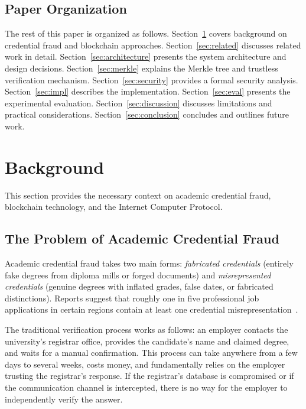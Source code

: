 \documentclass[conference]{IEEEtran}
\begin{document}
\subsection{Paper Organization}

The rest of this paper is organized as follows. Section~\ref{sec:background} covers background on credential fraud and blockchain approaches. Section~\ref{sec:related} discusses related work in detail. Section~\ref{sec:architecture} presents the system architecture and design decisions. Section~\ref{sec:merkle} explains the Merkle tree and trustless verification mechanism. Section~\ref{sec:security} provides a formal security analysis. Section~\ref{sec:impl} describes the implementation. Section~\ref{sec:eval} presents the experimental evaluation. Section~\ref{sec:discussion} discusses limitations and practical considerations. Section~\ref{sec:conclusion} concludes and outlines future work.

\section{Background}
\label{sec:background}

This section provides the necessary context on academic credential fraud, blockchain technology, and the Internet Computer Protocol.

\subsection{The Problem of Academic Credential Fraud}

Academic credential fraud takes two main forms: \emph{fabricated credentials} (entirely fake degrees from diploma mills or forged documents) and \emph{misrepresented credentials} (genuine degrees with inflated grades, false dates, or fabricated distinctions). Reports suggest that roughly one in five professional job applications in certain regions contain at least one credential misrepresentation~\cite{chahal2021credential}.

The traditional verification process works as follows: an employer contacts the university's registrar office, provides the candidate's name and claimed degree, and waits for a manual confirmation. This process can take anywhere from a few days to several weeks, costs money, and fundamentally relies on the employer trusting the registrar's response. If the registrar's database is compromised or if the communication channel is intercepted, there is no way for the employer to independently verify the answer.
\end{document}
